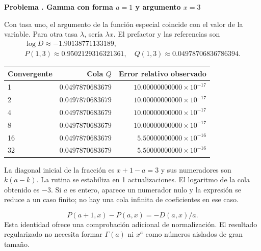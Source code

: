 \documentclass[11pt,a4paper]{article}
\theoremstyle{definition}
\newcounter{problema}
\newenvironment{resuelto}[1]{\refstepcounter{problema}\par\medskip\Needspace{6\baselineskip}\textbf{Problema \theproblema. #1}\par}{\par\medskip}
\begin{document}
\begin{resuelto}{Gamma con forma $a=1$ y argumento $x=3$}
Con tasa uno, el argumento de la función especial coincide con el valor de la variable. Para otra tasa $\lambda$, sería $\lambda x$. El prefactor y las referencias son
\[
\begin{gathered}
\log D\approx-1.90138771133189,\\
P(1,3)\approx0.9502129316321361,\quad Q(1,3)\approx0.04978706836786394.
\end{gathered}
\]

\begin{center}\small\begin{tabular}{lrr}
\toprule
Convergente & Cola $Q$ & Error relativo observado\\\midrule
1 & $0.0497870683679$ & $10.00000000000\times10^{-17}$\\
2 & $0.0497870683679$ & $10.00000000000\times10^{-17}$\\
4 & $0.0497870683679$ & $10.00000000000\times10^{-17}$\\
8 & $0.0497870683679$ & $10.00000000000\times10^{-17}$\\
16 & $0.0497870683679$ & $5.50000000000\times10^{-16}$\\
32 & $0.0497870683679$ & $5.50000000000\times10^{-16}$\\
\bottomrule\end{tabular}\end{center}

La diagonal inicial de la fracción es $x+1-a=3$ y sus numeradores son $k(a-k)$. La rutina se estabiliza en 1 actualizaciones. El logaritmo de la cola obtenido es $-3$.
Si $a$ es entero, aparece un numerador nulo y la expresión se reduce a un caso finito; no hay una cola infinita de coeficientes en ese caso.

\[
P(a+1,x)-P(a,x)=-D(a,x)/a.
\]
Esta identidad ofrece una comprobación adicional de normalización. El resultado regularizado no necesita formar $\Gamma(a)$ ni $x^a$ como números aislados de gran tamaño.
\end{resuelto}
\end{document}
